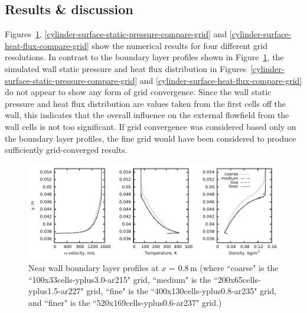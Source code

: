 \subsection{Results \& discussion}
%
Figures~\ref{cylinder-bl-profiles}, \ref{cylinder-surface-static-pressure-compare-grid} 
and \ref{cylinder-surface-heat-flux-compare-grid} show the numerical results for 
four different grid resolutions. In contrast to the boundary layer profiles shown 
in Figure~\ref{cylinder-bl-profiles}, the simulated wall static pressure and heat 
flux distribution in Figures~\ref{cylinder-surface-static-pressure-compare-grid} and 
\ref{cylinder-surface-heat-flux-compare-grid} 
do not appear to show any form of grid convergence. Since the wall static pressure 
and heat flux distribution are values taken from the first cells off the wall, this 
indicates that the overall influence on the external flowfield from the wall cells is 
not too significant. If grid convergence was considered based only on the boundary 
layer profiles, the fine grid would have been considered to produce sufficiently 
grid-converged results.
%
\begin{figure}[h]
 \begin{center}
  \includegraphics[width=15cm]{./chap3-mallinson-cylinder/figs/boundary-layer-profile-800mm.pdf}
 \end{center}
 \caption{Near wall boundary layer profiles at $x$ = 0.8\,m 
          (where ``coarse" is the ``100x33cells-yplus3.0-ar215" grid, 
          ``medium" is the ``200x65cells-yplus1.5-ar227" grid,
          ``fine" is the ``400x130cells-yplus0.8-ar235" grid, and
          ``finer" is the ``520x169cells-yplus0.6-ar237" grid.)}
 \label{cylinder-bl-profiles}
\end{figure}
